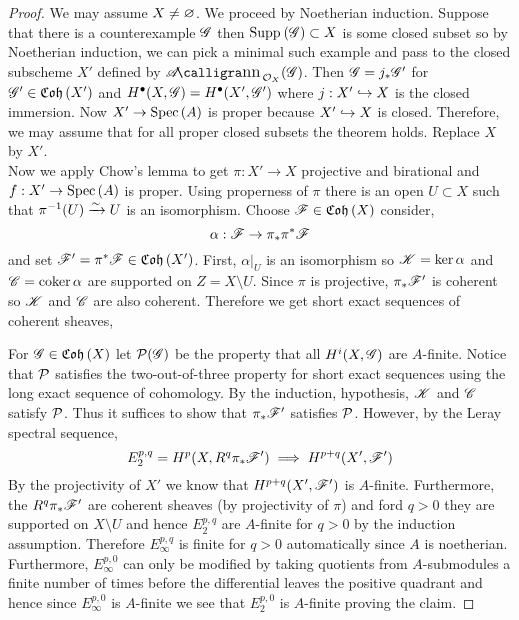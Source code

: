 \documentclass[12pt]{article}
\begin{document}
\begin{proof}
We may assume $X \neq \varnothing$. We proceed by Noetherian induction. Suppose that there is a counterexample $\mathscr{G}$ then $\mathrm{Supp}_{}\left(\mathscr{G} \right) \subset X$ is some closed subset so by Noetherian induction, we can pick a minimal such example and pass to the closed subscheme $X'$ defined by $\shAnn{\struct{X}}{\G}$. Then $\mathscr{G} = j_* \mathscr{G}'$ for $\mathscr{G}' \in \mathfrak{Coh}\left(X'\right)$ and $H^\bullet(X, \mathscr{G}) = H^\bullet(X', \mathscr{G}')$ where $j : X' \hookrightarrow X$ is the closed immersion. Now $X' \to \mathrm{Spec}\left( A \right)$ is proper because $X' \hookrightarrow X$ is closed. Therefore, we may assume that for all proper closed subsets the theorem holds. Replace $X$ by $X'$.
\bigskip\\
Now we apply Chow's lemma to get $\pi : X' \to X$ projective and birational and $f : X' \to \mathrm{Spec}\left( A \right)$ is proper. Using properness of $\pi$ there is an open $U \subset X$ such that $\pi^{-1}(U) \xrightarrow{\sim} U$ is an isomorphism. Choose $\mathscr{F} \in \mathfrak{Coh}\left(X\right)$ consider,
\[ \alpha : \mathscr{F} \to \pi_* \pi^* \mathscr{F} \]
and set $\mathscr{F}' = \pi^* \mathscr{F} \in \mathfrak{Coh}\left(X'\right)$. First, $\alpha|_U$ is an isomorphism so $\mathscr{K} = \ker{\alpha}$ and $\mathscr{C} = \operatorname{\mathrm{coker}}{\alpha}$ are supported on $Z = X \setminus U$. Since $\pi$ is projective, $\pi_* \mathscr{F}'$ is coherent so $\mathscr{K}$ and $\mathscr{C}$ are also coherent. Therefore we get short exact sequences of coherent sheaves,
\begin{center}
\end{center}
For $\mathscr{G} \in \mathfrak{Coh}\left(X\right)$ let $\mathcal{P}(\mathscr{G})$ be the property that all $H^i(X, \mathscr{G})$ are $A$-finite. Notice that $\mathcal{P}$ satisfies the two-out-of-three property for short exact sequences using the long exact sequence of cohomology. By the induction, hypothesis, $\mathscr{K}$ and $\mathscr{C}$ satisfy $\mathcal{P}$. Thus it suffices to show that $\pi_* \mathscr{F}'$ satisfies $\mathcal{P}$. However, by the Leray spectral sequence,
\[ E_2^{p,q} = H^p(X, R^q \pi_* \mathscr{F}') \implies H^{p+q}(X', \mathscr{F}') \]
By the projectivity of $X'$ we know that $H^{p+q}(X', \mathscr{F}')$ is $A$-finite. Furthermore, the $R^q \pi_* \mathscr{F}'$ are coherent sheaves (by projectivity of $\pi$) and ford $q > 0$ they are supported on $X \setminus U$ and hence $E_2^{p,q}$ are $A$-finite for $q > 0$ by the induction assumption. Therefore $E_{\infty}^{p,q}$ is finite for $q > 0$ automatically since $A$ is noetherian. Furthermore, $E^{p, 0}_{\infty}$ can only be modified by taking quotients from $A$-submodules a finite number of times before the differential leaves the positive quadrant and hence since $E_{\infty}^{p,0}$ is $A$-finite we see that $E_{2}^{p, 0}$ is $A$-finite proving the claim. 
\end{proof}
\end{document}
